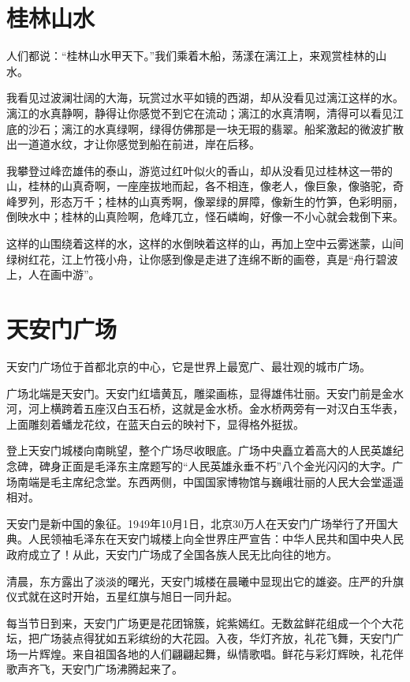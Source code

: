 \documentclass[12pt,UTF-8,openany]{ctexbook}
\begin{document}
\chapter{桂林山水}

\begin{large}
    
    人们都说：“桂林山水甲天下。”我们乘着木船，荡漾在漓江上，来观赏桂林的山水。
    
    我看见过波澜壮阔的大海，玩赏过水平如镜的西湖，却从没看见过漓江这样的水。漓江的水真静啊，静得让你感觉不到它在流动；漓江的水真清啊，清得可以看见江底的沙石；漓江的水真绿啊，绿得仿佛那是一块无瑕的翡翠。船桨激起的微波扩散出一道道水纹，才让你感觉到船在前进，岸在后移。
    
    我攀登过峰峦雄伟的泰山，游览过红叶似火的香山，却从没看见过桂林这一带的山，桂林的山真奇啊，一座座拔地而起，各不相连，像老人，像巨象，像骆驼，奇峰罗列，形态万千；桂林的山真秀啊，像翠绿的屏障，像新生的竹笋，色彩明丽，倒映水中；桂林的山真险啊，危峰兀立，怪石嶙峋，好像一不小心就会栽倒下来。
    
    这样的山围绕着这样的水，这样的水倒映着这样的山，再加上空中云雾迷蒙，山间绿树红花，江上竹筏小舟，让你感到像是走进了连绵不断的画卷，真是“舟行碧波上，人在画中游”。
    
\end{large}



\chapter{天安门广场}

\begin{large}
    
    天安门广场位于首都北京的中心，它是世界上最宽广、最壮观的城市广场。
    
    广场北端是天安门。天安门红墙黄瓦，雕梁画栋，显得雄伟壮丽。天安门前是金水河，河上横跨着五座汉白玉石桥，这就是金水桥。金水桥两旁有一对汉白玉华表，上面雕刻着蟠龙花纹，在蓝天白云的映衬下，显得格外挺拔。
    
    登上天安门城楼向南眺望，整个广场尽收眼底。广场中央矗立着高大的人民英雄纪念碑，碑身正面是毛泽东主席题写的“人民英雄永垂不朽”八个金光闪闪的大字。广场南端是毛主席纪念堂。东西两侧，中国国家博物馆与巍峨壮丽的人民大会堂遥遥相对。
    
    天安门是新中国的象征。1949年10月1日，北京30万人在天安门广场举行了开国大典。人民领袖毛泽东在天安门城楼上向全世界庄严宣告：中华人民共和国中央人民政府成立了！从此，天安门广场成了全国各族人民无比向往的地方。
    
    清晨，东方露出了淡淡的曙光，天安门城楼在晨曦中显现出它的雄姿。庄严的升旗仪式就在这时开始，五星红旗与旭日一同升起。
    
    每当节日到来，天安门广场更是花团锦簇，姹紫嫣红。无数盆鲜花组成一个个大花坛，把广场装点得犹如五彩缤纷的大花园。入夜，华灯齐放，礼花飞舞，天安门广场一片辉煌。来自祖国各地的人们翩翩起舞，纵情歌唱。鲜花与彩灯辉映，礼花伴歌声齐飞，天安门广场沸腾起来了。
    
\end{large}
\end{document}
